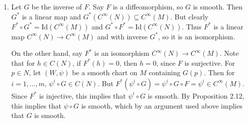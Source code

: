 \documentclass[10pt,letter]{article}
\begin{document}
\begin{enumerate}[label=(\alph*)]
\item Let $G$ be the inverse of $F$. Say $F$ is a diffeomorphism, so $G$ is smooth. Then  $G^{\ast}$ is a linear map and $G^{\ast}(C^{\infty}(N)) \subseteq C^{\infty}(M)$. But clearly $F^{\ast} \circ G^{\ast} = \text{Id}(C^{\infty}(M))$ and $G^{\ast} \circ F^{\ast} = \text{Id}(C^\infty(N))$. Thus $F^{\ast}$ is a linear map $C^{\infty}(N) \rightarrow C^{\infty}(M)$ and with inverse $G^{\ast}$, so it is an isomorphism. 

On the other hand, say $F^{\ast}$ is an isomorphism $C^{\infty}(N) \rightarrow C^{\infty}(M)$. Note that for $h \in C(N)$, if $F^{\ast}(h) = 0$, then $h = 0$, since $F$ is surjective. For $p \in N$, let $(W,\psi)$ be a smooth chart on $M$ containing $G(p)$. Then for $i=1,...,m$, $\psi^i \circ G \in C(N)$. But $F^{\ast}(\psi^i \circ G) = \psi^i \circ G \circ F = \psi^i \in C^{\infty}(M)$. Since $F^{\ast}$ is injective, this implies that $\psi^i \circ G$ is smooth. By Proposition 2.12, this implies that $\psi \circ G$ is smooth, which by an argument used above implies that $G$ is smooth.
\end{enumerate}
\end{document}
